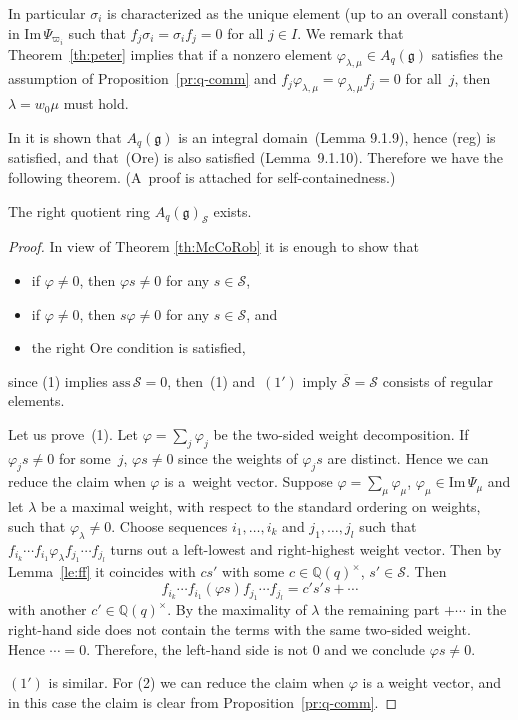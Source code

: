 \documentclass[pdftex]{sigma}
\newcommand{\geh}{\mathfrak{g}}
\newcommand{\la}{\lambda}
\newcommand{\Q}{{\mathbb Q}}
\begin{document}
In particular
$\sigma_i$ is characterized as the unique element (up to an overall constant)
in $\mathrm{Im}\, \Psi_{\varpi_i}$ such that
$f_j \sigma_i = \sigma_i f_j = 0$ for all $j \in I$.
We remark that Theorem~\ref{th:peter} implies that
if a nonzero element $\varphi_{\lambda,\mu} \in A_q(\geh)$
satisf\/ies the assumption of Proposition~\ref{pr:q-comm} and
$f_j \varphi_{\lambda,\mu}
= \varphi_{\lambda,\mu} f_j = 0$ for all~$j$,
then $\lambda = w_0\mu$ must hold.

In \cite{Joseph} it is shown that $A_q(\geh)$ is an integral domain~(Lemma 9.1.9), hence (reg) is
satisf\/ied, and that~(Ore) is also satisf\/ied (Lemma~9.1.10). Therefore we have the following theorem.
(A~proof is attached for self-containedness.)

\begin{theorem}\label{th:quotient}
The right quotient ring $A_q(\geh)_\mathcal{S}$ exists.
\end{theorem}

\begin{proof}
In view of Theorem \ref{th:McCoRob} it is enough to show that
\begin{itemize}\itemsep=0pt
\item[(1)] if $\varphi\ne0$, then $\varphi s\ne0$ for any $s\in\mathcal{S}$,
\item[$(1')$] if $\varphi\ne0$, then $s\varphi\ne0$ for any $s\in\mathcal{S}$, and
\item[(2)] the right Ore condition is satisf\/ied,
\end{itemize}
since (1) implies $\mathrm{ass}\,\mathcal{S}=0$, then~(1) and~$(1')$ imply $\overline{\mathcal{S}}=
\mathcal{S}$ consists of regular elements.

Let us prove~(1). Let $\varphi=\sum_j\varphi_j$ be the two-sided weight decomposition.
If $\varphi_js\ne0$ for some~$j$,
$\varphi s\ne0$ since the weights of $\varphi_js$ are distinct.
Hence we can reduce the claim when $\varphi$ is a~weight vector.
Suppose $\varphi=\sum_\mu\varphi_\mu$, $\varphi_\mu\in\mathrm{Im}\,\Psi_\mu$ and let $\la$ be a maximal
weight, with respect to the standard ordering on weights, such that $\varphi_\la\ne0$. Choose sequences
$i_1,\ldots,i_k$ and $j_1,\ldots,j_l$ such that
$f_{i_k}\cdots f_{i_1}\varphi_\la f_{j_1}\cdots f_{j_l}$
turns out a left-lowest and right-highest weight vector.
Then by Lemma~\ref{le:ff} it coincides with $cs'$
with some $c\in\Q(q)^\times$, $s'\in\mathcal{S}$. Then
\[
f_{i_k}\cdots f_{i_1}(\varphi s)f_{j_1}\cdots f_{j_l}=c's's+\cdots
\]
with another $c'\in\Q(q)^\times$. By the maximality of $\la$ the remaining part $+\cdots$ in the right-hand
side does not contain
the terms with the same two-sided weight. Hence $\cdots=0$.
Therefore, the left-hand side is
not $0$ and we conclude $\varphi s\ne0$.

$(1')$ is similar.
For (2) we can reduce the claim when $\varphi$ is a weight vector, and in this case the claim is clear from
Proposition~\ref{pr:q-comm}.
\end{proof}
\end{document}
